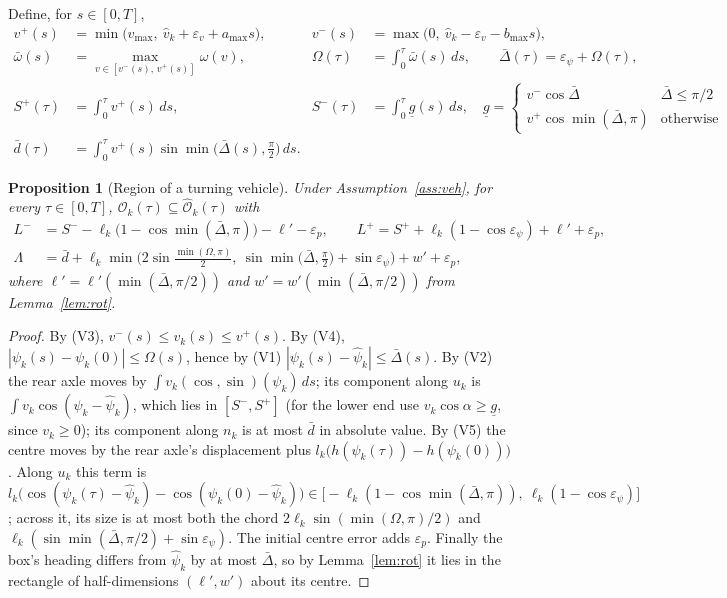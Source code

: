 \documentclass[11pt]{article}
\newtheorem{proposition}{Proposition}
\theoremstyle{definition}
\theoremstyle{remark}
\newcommand{\Occ}{\mathcal{O}}
\newcommand{\Ohat}{\widehat{\mathcal{O}}}
\begin{document}
Define, for $s\in[0,T]$,
\begin{align*}
v^+(s)&=\min\big(v_{\max},\ \hat v_k+\varepsilon_v+a_{\max}s\big), & v^-(s)&=\max\big(0,\ \hat v_k-\varepsilon_v-b_{\max}s\big),\\
\bar\omega(s)&=\max_{v\in[v^-(s),\,v^+(s)]}\omega(v), & \Omega(\tau)&=\int_0^\tau\bar\omega(s)\,ds,\qquad \bar\Delta(\tau)=\varepsilon_\psi+\Omega(\tau),\\
S^+(\tau)&=\int_0^\tau v^+(s)\,ds, & S^-(\tau)&=\int_0^\tau \underline{g}(s)\,ds,\quad
\underline{g}=\begin{cases}v^-\cos\bar\Delta & \bar\Delta\le\pi/2\\ v^+\cos\min(\bar\Delta,\pi) & \text{otherwise}\end{cases}\\
\bar d(\tau)&=\int_0^\tau v^+(s)\sin\min\big(\bar\Delta(s),\tfrac\pi2\big)\,ds.
\end{align*}

\begin{proposition}[Region of a turning vehicle]\label{prop:veh}
Under Assumption~\ref{ass:veh}, for every $\tau\in[0,T]$, $\Occ_k(\tau)\subseteq\Ohat_k(\tau)$ with
\begin{align*}
L^-&=S^--\ell_k\big(1-\cos\min(\bar\Delta,\pi)\big)-\ell'-\varepsilon_p, \qquad
L^+=S^++\ell_k(1-\cos\varepsilon_\psi)+\ell'+\varepsilon_p,\\
\Lambda&=\bar d+\ell_k\min\Big(2\sin\tfrac{\min(\Omega,\pi)}2,\ \sin\min\big(\bar\Delta,\tfrac\pi2\big)+\sin\varepsilon_\psi\Big)+w'+\varepsilon_p,
\end{align*}
where $\ell'=\ell'(\min(\bar\Delta,\pi/2))$ and $w'=w'(\min(\bar\Delta,\pi/2))$ from Lemma~\ref{lem:rot}.
\end{proposition}
\begin{proof}
By (V3), $v^-(s)\le v_k(s)\le v^+(s)$. By (V4), $|\psi_k(s)-\psi_k(0)|\le\Omega(s)$, hence by (V1)
$|\psi_k(s)-\hat\psi_k|\le\bar\Delta(s)$. By (V2) the rear axle moves by
$\int v_k(\cos,\sin)(\psi_k)\,ds$; its component along $u_k$ is $\int v_k\cos(\psi_k-\hat\psi_k)$, which lies
in $[S^-,S^+]$ (for the lower end use $v_k\cos\alpha\ge\underline g$, since $v_k\ge0$); its component along
$n_k$ is at most $\bar d$ in absolute value. By (V5) the centre moves by the rear axle's displacement
plus $l_k\big(h(\psi_k(\tau))-h(\psi_k(0))\big)$. Along $u_k$ this term is
$l_k\big(\cos(\psi_k(\tau)-\hat\psi_k)-\cos(\psi_k(0)-\hat\psi_k)\big)\in\big[-\ell_k(1-\cos\min(\bar\Delta,\pi)),\ \ell_k(1-\cos\varepsilon_\psi)\big]$;
across it, its size is at most both the chord $2\ell_k\sin(\min(\Omega,\pi)/2)$ and
$\ell_k(\sin\min(\bar\Delta,\pi/2)+\sin\varepsilon_\psi)$. The initial centre error adds $\varepsilon_p$.
Finally the box's heading differs from $\hat\psi_k$ by at most $\bar\Delta$, so by Lemma~\ref{lem:rot} it
lies in the rectangle of half-dimensions $(\ell',w')$ about its centre.
\end{proof}
\end{document}
